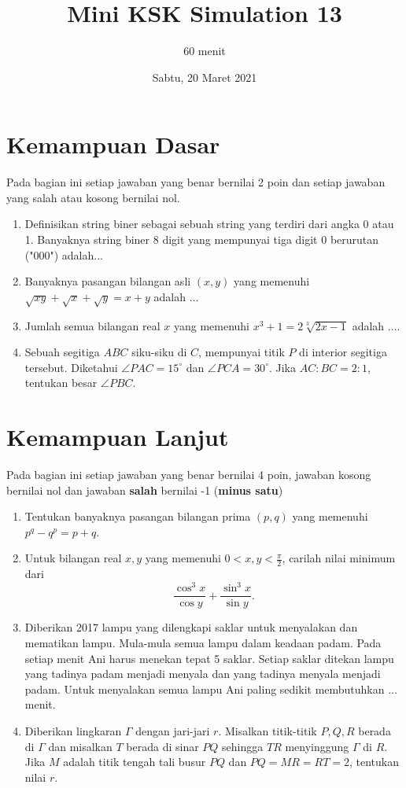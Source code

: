 \documentclass{article}
\title{Mini KSK Simulation 13}
\author{60 menit}
\date{Sabtu, 20 Maret 2021}
\begin{document}
	\maketitle
	
	\section{Kemampuan Dasar}
	Pada bagian ini setiap jawaban yang benar bernilai 2 poin dan setiap jawaban yang salah
	atau kosong bernilai nol.
	\begin{enumerate}
		\item Definisikan string biner sebagai sebuah string yang terdiri dari angka 0 atau 1. Banyaknya string biner 8 digit yang mempunyai tiga digit 0 berurutan ("000") adalah...
		
		\item Banyaknya pasangan bilangan asli $(x,y)$ yang memenuhi $\sqrt{xy}+\sqrt{x}+\sqrt{y}= x+y$ adalah $\dots$
		
		\item Jumlah semua bilangan real $x$ yang memenuhi $x^3+1=2\sqrt[3]{2x-1}$ adalah $\dots$.
		
		\item Sebuah segitiga $ABC$ siku-siku di $C$, mempunyai titik $P$ di interior segitiga tersebut. Diketahui $\angle PAC = 15^\circ$ dan $\angle PCA = 30^\circ$. Jika $AC:BC = 2:1$, tentukan besar $\angle PBC$.
	\end{enumerate}

\section{Kemampuan Lanjut}
Pada bagian ini setiap jawaban yang benar bernilai 4 poin, jawaban kosong bernilai nol
dan jawaban \textbf{salah} bernilai -1 (\textbf{minus satu})

\begin{enumerate}[resume]
		\item Tentukan banyaknya pasangan bilangan prima $(p,q)$ yang memenuhi $p^q-q^p = p+q$.
		
		\item Untuk bilangan real $x,y$ yang memenuhi $0 < x,y < \frac{\pi}{2}$, carilah nilai minimum dari $$\frac{\cos^3 x}{\cos y}+\frac{\sin^3 x}{\sin y}.$$
		
		\item Diberikan 2017 lampu yang dilengkapi saklar untuk menyalakan dan mematikan
		lampu. Mula-mula semua lampu dalam keadaan padam. Pada setiap menit Ani harus
		menekan tepat 5 saklar. Setiap saklar ditekan lampu yang tadinya padam menjadi
		menyala dan yang tadinya menyala menjadi padam. Untuk menyalakan semua lampu
		Ani paling sedikit membutuhkan $\dots$ menit.
		
		\item Diberikan lingkaran $\Gamma$ dengan jari-jari $r$. Misalkan titik-titik $P,Q,R$ berada di $\Gamma$ dan misalkan $T$ berada di sinar $PQ$ sehingga $TR$ menyinggung $\Gamma$ di $R$. Jika $M$ adalah titik tengah tali busur $PQ$ dan $PQ = MR = RT = 2$, tentukan nilai $r$. 
	
\end{enumerate}
\end{document}
